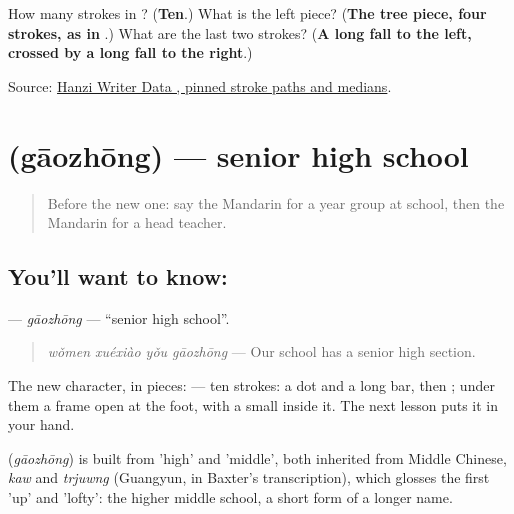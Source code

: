 \begin{tcolorbox}[breakable,colback=teal!4,colframe=teal!35!black,title={Before you move on}]
How many strokes in ? (\textbf{Ten}.) What is the left piece? (\textbf{The tree piece, four strokes, as in }.) What are the last two strokes? (\textbf{A long fall to the left, crossed by a long fall to the right}.)

Source: \href{https://raw.githubusercontent.com/chanind/hanzi-writer-data/68d10a4b21150cae5e1ebbd223eed289cf32d90c/data/\%E6\%A0\%A1.json}{Hanzi Writer Data , pinned stroke paths and medians}.
\end{tcolorbox}
\section[\texorpdfstring{\zh{高中} (gāozhōng)}{高中 (gāozhōng)}]{ (gāozhōng) — senior high school}

\label{lesson:ZH-C248-gaozhong}



\begin{quote}
Before the new one: say the Mandarin for a year group at school, then the Mandarin for a head teacher.
\end{quote}

\subsection*{You'll want to know: }
\textbf{} — \emph{gāozhōng} — \textquotedblleft{}senior high school\textquotedblright{}.

\begin{quote}
\textbf{} \emph{wǒmen xuéxiào yǒu gāozhōng} — Our school has a senior high section.
\end{quote}

The new character, in pieces:  — ten strokes: a dot and a long bar, then ; under them a frame open at the foot, with a small  inside it. The next lesson puts it in your hand.

\begin{cousinweb}
\textbf{} (\emph{gāozhōng}) is built from  'high' and  'middle', both inherited from Middle Chinese, \emph{kaw} and \emph{trjuwng} (Guangyun, in Baxter's transcription), which glosses the first 'up' and 'lofty': the higher middle school, a short form of a longer name.
\end{cousinweb}

